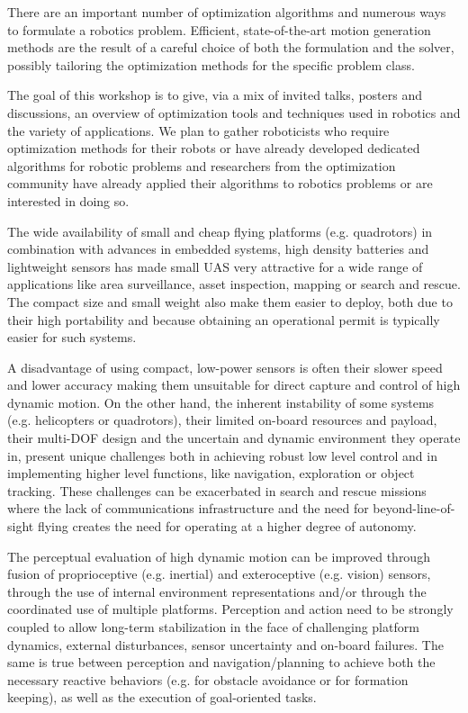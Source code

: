 \begin{spacing}{1.0}
{There are an important number of optimization algorithms and numerous ways to formulate a robotics problem. Efficient, state-of-the-art motion generation methods are the result of a careful choice of both the formulation and the solver, possibly tailoring the optimization methods for the specific problem class.

The goal of this workshop is to give, via a mix of invited talks, posters and discussions, an overview of optimization tools and techniques used in robotics and the variety of applications. We plan to gather roboticists who require optimization methods for their robots or have already developed dedicated algorithms for robotic problems and researchers from the optimization community have already applied their algorithms to robotics problems or are interested in doing so. 
}




{
The wide availability of small and cheap flying platforms (e.g. quadrotors) in combination with advances in embedded systems, high density batteries and lightweight sensors has made small UAS very attractive for a wide range of applications like area surveillance, asset inspection, mapping or search and rescue. The compact size and small weight also make them easier to deploy, both due to their high portability and because obtaining an operational permit is typically easier for such systems.

A disadvantage of using compact, low-power sensors is often their slower speed and lower accuracy making them unsuitable for direct capture and control of high dynamic motion. On the other hand, the inherent instability of some systems (e.g. helicopters or quadrotors), their limited on-board resources and payload, their multi-DOF design and the uncertain and dynamic environment they operate in, present unique challenges both in achieving robust low level control and in implementing higher level functions, like navigation, exploration or object tracking. These challenges can be exacerbated in search and rescue missions where the lack of communications infrastructure and the need for beyond-line-of-sight flying creates the need for operating at a higher degree of autonomy.

The perceptual evaluation of high dynamic motion can be improved through fusion of proprioceptive (e.g. inertial) and exteroceptive (e.g. vision) sensors, through the use of internal environment representations and/or through the coordinated use of multiple platforms. Perception and action need to be strongly coupled to allow long-term stabilization in the face of challenging platform dynamics, external disturbances, sensor uncertainty and on-board failures. The same is true between perception and navigation/planning to achieve both the necessary reactive behaviors (e.g. for obstacle avoidance or for formation keeping), as well as the execution of goal-oriented tasks.

}
\end{spacing}
